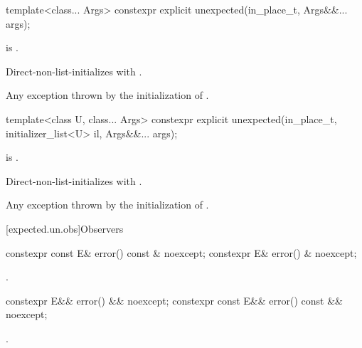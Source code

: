 %
\begin{itemdecl}
template<class... Args>
  constexpr explicit unexpected(in_place_t, Args&&... args);
\end{itemdecl}

\begin{itemdescr}
\pnum
\constraints
{} is .

\pnum
\effects
Direct-non-list-initializes
 with .

\pnum
\throws
Any exception thrown by the initialization of .
\end{itemdescr}

%
\begin{itemdecl}
template<class U, class... Args>
  constexpr explicit unexpected(in_place_t, initializer_list<U> il, Args&&... args);
\end{itemdecl}

\begin{itemdescr}
\pnum
\constraints
{} is .

\pnum
\effects
Direct-non-list-initializes
 with .

\pnum
\throws
Any exception thrown by the initialization of .

\end{itemdescr}

[expected.un.obs]{Observers}

%
\begin{itemdecl}
constexpr const E& error() const & noexcept;
constexpr E& error() & noexcept;
\end{itemdecl}

\begin{itemdescr}
\pnum
\returns
{}.
\end{itemdescr}

%
\begin{itemdecl}
constexpr E&& error() && noexcept;
constexpr const E&& error() const && noexcept;
\end{itemdecl}

\begin{itemdescr}
\pnum
\returns
{}.
\end{itemdescr}

